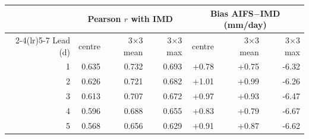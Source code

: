 \begin{tabular}{rrrrrrr}\toprule & \multicolumn{3}{c}{Pearson $r$ with IMD} & \multicolumn{3}{c}{Bias AIFS$-$IMD (mm/day)} \\\cmidrule(lr){2-4}\cmidrule(lr){5-7} Lead (d) & centre & 3$\times$3 mean & 3$\times$3 max & centre & 3$\times$3 mean & 3$\times$3 max \\ \midrule
1 & 0.635 & 0.732 & 0.693 & +0.78 & +0.75 & -6.32 \\
2 & 0.626 & 0.721 & 0.682 & +1.01 & +0.99 & -6.26 \\
3 & 0.613 & 0.707 & 0.672 & +0.97 & +0.93 & -6.47 \\
4 & 0.596 & 0.688 & 0.655 & +0.83 & +0.79 & -6.67 \\
5 & 0.568 & 0.656 & 0.629 & +0.91 & +0.87 & -6.62 \\
\bottomrule\end{tabular}